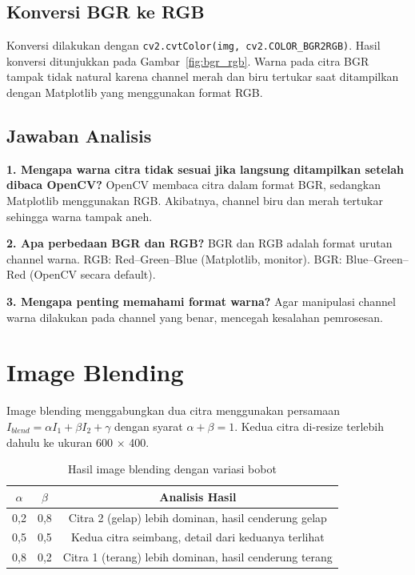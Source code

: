 \documentclass[12pt,a4paper]{article}
\begin{document}
\subsection{Konversi BGR ke RGB}
Konversi dilakukan dengan \texttt{cv2.cvtColor(img, cv2.COLOR\_BGR2RGB)}. Hasil konversi
ditunjukkan pada Gambar~\ref{fig:bgr_rgb}. Warna pada citra BGR tampak tidak natural karena
channel merah dan biru tertukar saat ditampilkan dengan Matplotlib yang menggunakan format RGB.

\subsection{Jawaban Analisis}

\textbf{1. Mengapa warna citra tidak sesuai jika langsung ditampilkan setelah dibaca OpenCV?}
OpenCV membaca citra dalam format BGR, sedangkan Matplotlib menggunakan RGB. Akibatnya,
channel biru dan merah tertukar sehingga warna tampak aneh.

\textbf{2. Apa perbedaan BGR dan RGB?}
BGR dan RGB adalah format urutan channel warna. RGB: Red--Green--Blue (Matplotlib, monitor).
BGR: Blue--Green--Red (OpenCV secara default).

\textbf{3. Mengapa penting memahami format warna?}
Agar manipulasi channel warna dilakukan pada channel yang benar, mencegah kesalahan pemrosesan.

\section{Image Blending}

Image blending menggabungkan dua citra menggunakan persamaan $I_{blend} = \alpha I_1 + \beta I_2 + \gamma$
dengan syarat $\alpha + \beta = 1$. Kedua citra di-resize terlebih dahulu ke ukuran 600 $\times$ 400.

\begin{table}[H]
\centering
\caption{Hasil image blending dengan variasi bobot}
\label{tab:blending}
\begin{tabular}{ccc}
\toprule
$\alpha$ & $\beta$ & Analisis Hasil\\
\midrule
0,2 & 0,8 & Citra 2 (gelap) lebih dominan, hasil cenderung gelap\\
0,5 & 0,5 & Kedua citra seimbang, detail dari keduanya terlihat\\
0,8 & 0,2 & Citra 1 (terang) lebih dominan, hasil cenderung terang\\
\bottomrule
\end{tabular}
\end{table}
\end{document}
